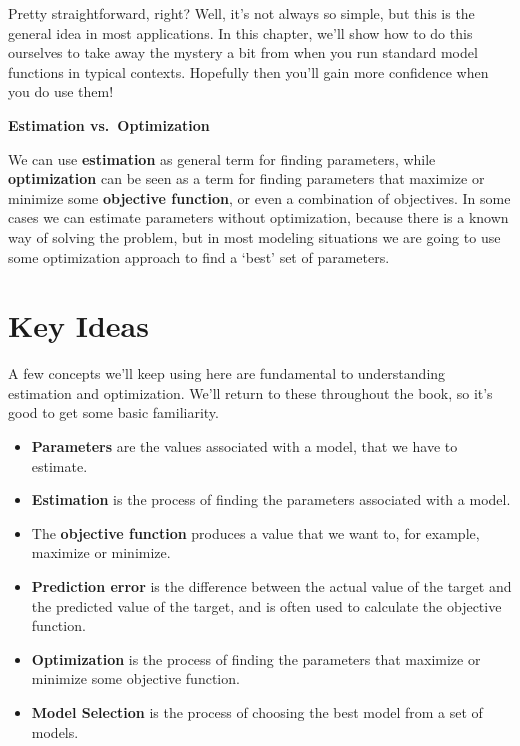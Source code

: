\documentclass[
  letterpaper,
]{krantz}
\providecommand{\tightlist}{%
  \setlength{\itemsep}{0pt}\setlength{\parskip}{0pt}}\usepackage{longtable,booktabs,array}
\begin{document}
Pretty straightforward, right? Well, it's not always so simple, but this
is the general idea in most applications. In this chapter, we'll show
how to do this ourselves to take away the mystery a bit from when you
run standard model functions in typical contexts. Hopefully then you'll
gain more confidence when you do use them!

\begin{tcolorbox}[enhanced jigsaw, toprule=.15mm, colback=white, breakable, arc=.35mm, rightrule=.15mm, opacityback=0, bottomrule=.15mm, leftrule=.75mm, left=2mm]

\textbf{Estimation vs.~Optimization}\vspace{2mm}

We can use \textbf{estimation} as general term for finding parameters,
while \textbf{optimization} can be seen as a term for finding parameters
that maximize or minimize some \textbf{objective function}, or even a
combination of objectives. In some cases we can estimate parameters
without optimization, because there is a known way of solving the
problem, but in most modeling situations we are going to use some
optimization approach to find a `best' set of parameters.

\end{tcolorbox}

\section{Key Ideas}\label{sec-estim-key-ideas}

A few concepts we'll keep using here are fundamental to understanding
estimation and optimization. We'll return to these throughout the book,
so it's good to get some basic familiarity.

\begin{itemize}
\tightlist
\item
  \textbf{Parameters} are the values associated with a model, that we
  have to estimate.
\item
  \textbf{Estimation} is the process of finding the parameters
  associated with a model.
\item
  The \textbf{objective function} produces a value that we want to, for
  example, maximize or minimize.
\item
  \textbf{Prediction error} is the difference between the actual value
  of the target and the predicted value of the target, and is often used
  to calculate the objective function.
\item
  \textbf{Optimization} is the process of finding the parameters that
  maximize or minimize some objective function.
\item
  \textbf{Model Selection} is the process of choosing the best model
  from a set of models.
\end{itemize}
\end{document}
